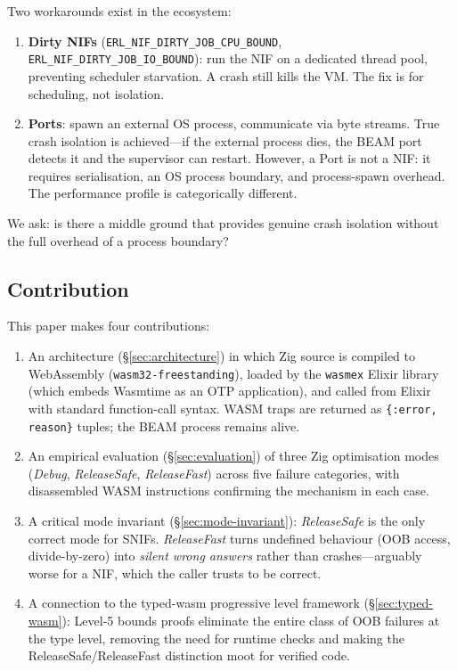 \documentclass[11pt,a4paper]{article}
\begin{document}
Two workarounds exist in the ecosystem:

\begin{enumerate}
  \item \textbf{Dirty NIFs} (\texttt{ERL\_NIF\_DIRTY\_JOB\_CPU\_BOUND},
        \texttt{ERL\_NIF\_DIRTY\_JOB\_IO\_BOUND}): run the NIF on a dedicated
        thread pool, preventing scheduler starvation. A crash still kills the
        VM. The fix is for scheduling, not isolation.

  \item \textbf{Ports}: spawn an external OS process, communicate via byte
        streams. True crash isolation is achieved---if the external process
        dies, the BEAM port detects it and the supervisor can restart. However,
        a Port is not a NIF: it requires serialisation, an OS process boundary,
        and process-spawn overhead. The performance profile is categorically
        different.
\end{enumerate}

We ask: is there a middle ground that provides genuine crash isolation without
the full overhead of a process boundary?

\subsection{Contribution}

This paper makes four contributions:

\begin{enumerate}
  \item An architecture (\S\ref{sec:architecture}) in which Zig source is
        compiled to WebAssembly (\texttt{wasm32-freestanding}), loaded by the
        \texttt{wasmex} Elixir library (which embeds Wasmtime as an OTP
        application), and called from Elixir with standard function-call
        syntax. WASM traps are returned as \texttt{\{:error, reason\}} tuples;
        the BEAM process remains alive.

  \item An empirical evaluation (\S\ref{sec:evaluation}) of three Zig
        optimisation modes (\textit{Debug}, \textit{ReleaseSafe},
        \textit{ReleaseFast}) across five failure categories, with
        disassembled WASM instructions confirming the mechanism in each case.

  \item A critical mode invariant (\S\ref{sec:mode-invariant}):
        \textit{ReleaseSafe} is the only correct mode for SNIFs.
        \textit{ReleaseFast} turns undefined behaviour (OOB access,
        divide-by-zero) into \textit{silent wrong answers} rather than
        crashes---arguably worse for a NIF, which the caller trusts to
        be correct.

  \item A connection to the typed-wasm progressive level framework
        (\S\ref{sec:typed-wasm}): Level-5 bounds proofs eliminate the
        entire class of OOB failures at the type level, removing the
        need for runtime checks and making the ReleaseSafe/ReleaseFast
        distinction moot for verified code.
\end{enumerate}
\end{document}
